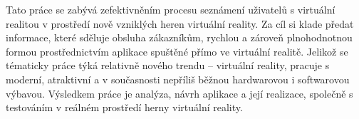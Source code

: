 Tato práce se zabývá zefektivněním procesu seznámení uživatelů s
virtuální realitou v prostředí nově vzniklých heren virtuální reality.
Za cíl si klade předat informace, které sděluje obsluha zákazníkům,
rychlou a zároveň plnohodnotnou formou prostřednictvím aplikace spuštěné
přímo ve virtuální realitě. Jelikož se tématicky práce týká relativně
nového trendu -- virtuální reality, pracuje s moderní, atraktivní a v
současnosti nepříliš běžnou hardwarovou i softwarovou výbavou. Výsledkem
práce je analýza, návrh aplikace a její realizace, společně s testováním
v reálném prostředí herny virtuální reality.
